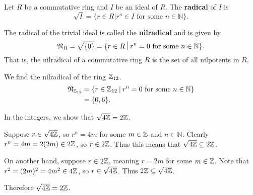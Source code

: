 \begin{definition}
    Let $R$ be a commutative ring and $I$ be an ideal of $R$. The \textbf{radical} of $I$ is
    \[
        \sqrt I = \{r \in R \vert r^n \in I \text{ for some } n \in \mathbb{N}\}.
    \]
\end{definition}
\begin{definition}
    The radical of the trivial ideal is called the \textbf{nilradical} and is given by
    \[
        \Nilr{R} = \sqrt{\{0\}} = \{r \in R \vert r^n = 0 \text{ for some } n \in \mathbb{N}\}.
    \]
    That is, the nilradical of a commutative ring $R$ is the set of all nilpotents in $R$.
\end{definition}
\begin{example}
    We find the nilradical of the ring $\mathbb{Z}_{12}$.
    \begin{align*}
        \Nilr{\Zn{12}} &= \{r \in \Zn{12} \vert r^n = 0 \text{ for some } n \in \mathbb{N}\}\\
        &= \{0, 6\}.
    \end{align*}
\end{example}
\begin{example}
    In the integers, we show that $\sqrt{4\mathbb{Z}} = 2\mathbb{Z}$.

    Suppose $r \in \sqrt{4\mathbb{Z}}$, so $r^n = 4m$ for some $m \in \mathbb{Z}$ and $n \in \mathbb{N}$. Clearly $r^n = 4m = 2(2m) \in 2\mathbb{Z}$, so $r \in 2\mathbb{Z}$. Thus this means that $\sqrt{4\mathbb{Z}} \subseteq 2\mathbb{Z}$.

    On another hand, suppose $r \in 2\mathbb{Z}$, meaning $r = 2m$ for some $m \in \mathbb{Z}$. Note that $r^2 = (2m)^2 = 4m^2 \in 4\mathbb{Z}$, so $r \in \sqrt{4\mathbb{Z}}$. Thus $2\mathbb{Z} \subseteq \sqrt{4\mathbb{Z}}$.

    Therefore $\sqrt{4\mathbb{Z}} = 2\mathbb{Z}$.
\end{example}

